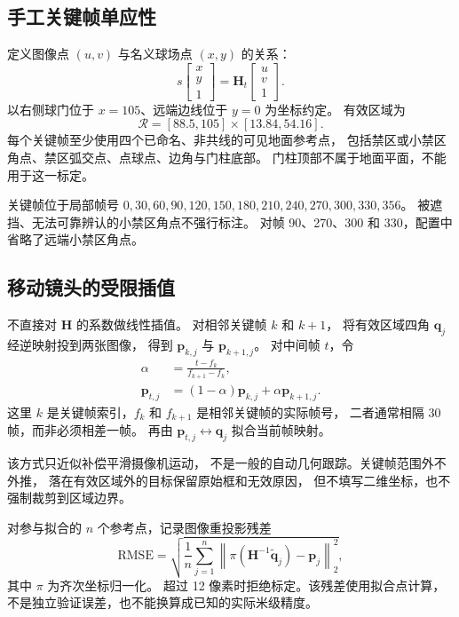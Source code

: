 \documentclass[UTF8,fontset=fandol,11pt,a4paper]{ctexart}
\newcommand{\ROI}{\mathcal{R}}
\begin{document}
\subsection{手工关键帧单应性}
定义图像点 $(u,v)$ 与名义球场点 $(x,y)$ 的关系：
\begin{equation}
 s
 \begin{bmatrix}x\\y\\1\end{bmatrix}
 =
 \mathbf{H}_t
 \begin{bmatrix}u\\v\\1\end{bmatrix}.
\end{equation}
以右侧球门位于 $x=105$、远端边线位于 $y=0$ 为坐标约定。
有效区域为
\begin{equation}
 \ROI=[88.5,105]\times[13.84,54.16].
\end{equation}
每个关键帧至少使用四个已命名、非共线的可见地面参考点，
包括禁区或小禁区角点、禁区弧交点、点球点、边角与门柱底部。
门柱顶部不属于地面平面，不能用于这一标定。

关键帧位于局部帧号
$0,30,60,90,120,150,180,210,240,270,300,330,356$。
被遮挡、无法可靠辨认的小禁区角点不强行标注。
对帧 90、270、300 和 330，配置中省略了远端小禁区角点。

\subsection{移动镜头的受限插值}
不直接对 $\mathbf{H}$ 的系数做线性插值。
对相邻关键帧 $k$ 和 $k+1$，
将有效区域四角 $\mathbf{q}_j$ 经逆映射投到两张图像，
得到 $\mathbf{p}_{k,j}$ 与 $\mathbf{p}_{k+1,j}$。
对中间帧 $t$，令
\begin{align}
 \alpha &=\frac{t-f_k}{f_{k+1}-f_k},\\
 \mathbf{p}_{t,j}
   &=(1-\alpha)\mathbf{p}_{k,j}+\alpha\mathbf{p}_{k+1,j}.
\end{align}
这里 $k$ 是关键帧索引，$f_k$ 和 $f_{k+1}$ 是相邻关键帧的实际帧号，
二者通常相隔 30 帧，而非必须相差一帧。
再由 $\mathbf{p}_{t,j}\leftrightarrow\mathbf{q}_j$ 拟合当前帧映射。

该方式只近似补偿平滑摄像机运动，
不是一般的自动几何跟踪。关键帧范围外不外推，
落在有效区域外的目标保留原始框和无效原因，
但不填写二维坐标，也不强制裁剪到区域边界。

对参与拟合的 $n$ 个参考点，记录图像重投影残差
\begin{equation}
 \mathrm{RMSE}
 =\sqrt{\frac1n\sum_{j=1}^{n}
   \left\|\pi(\mathbf{H}^{-1}\widetilde{\mathbf{q}}_j)
           -\mathbf{p}_j\right\|_2^2},
\end{equation}
其中 $\pi$ 为齐次坐标归一化。
超过 12 像素时拒绝标定。该残差使用拟合点计算，
不是独立验证误差，也不能换算成已知的实际米级精度。
\end{document}
